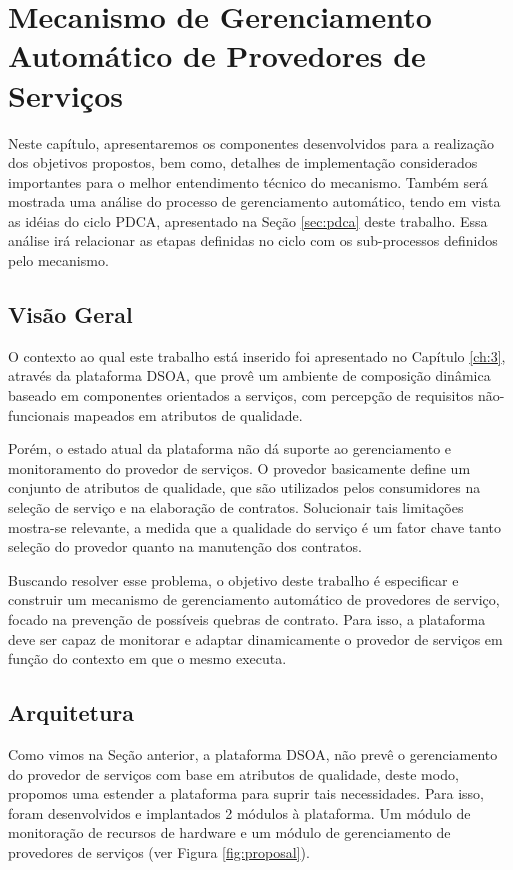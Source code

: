 \chapter{Mecanismo de Gerenciamento Automático de Provedores de Serviços}
\label{ch:4}

Neste capítulo, apresentaremos os componentes desenvolvidos para a realização dos objetivos propostos, bem como, detalhes de implementação considerados importantes para o melhor entendimento técnico do mecanismo. Também será mostrada uma análise do processo de gerenciamento automático, tendo em vista as idéias do ciclo PDCA, apresentado na Seção \ref{sec:pdca} deste trabalho. Essa análise irá relacionar as etapas definidas no ciclo com os sub-processos definidos pelo mecanismo.

\section{Visão Geral}
O contexto ao qual este trabalho está inserido foi apresentado no Capítulo \ref{ch:3}, através da plataforma DSOA, que provê um ambiente de composição dinâmica baseado em componentes orientados a serviços, com percepção de requisitos não-funcionais mapeados em atributos de qualidade. 

Porém, o estado atual da plataforma não dá suporte ao gerenciamento e monitoramento do provedor de serviços. O provedor basicamente define um conjunto de atributos de qualidade, que são utilizados pelos consumidores na seleção de serviço e na elaboração de contratos. Solucionair tais limitações mostra-se relevante, a medida que a qualidade do serviço é um fator chave tanto seleção do provedor quanto na manutenção dos contratos.

Buscando resolver esse problema, o objetivo deste trabalho é especificar e construir um mecanismo de gerenciamento automático de provedores de serviço, focado na prevenção de possíveis quebras de contrato. Para isso, a plataforma deve ser capaz de monitorar e adaptar dinamicamente o provedor de serviços em função do contexto em que o mesmo executa.


\section{Arquitetura}
\label{sec:arch_prop}

Como vimos na Seção anterior, a plataforma DSOA, não prevê o gerenciamento do provedor de serviços com base em atributos de qualidade, deste modo, propomos uma estender a plataforma para suprir tais necessidades. Para isso, foram desenvolvidos e implantados 2 módulos à plataforma. Um módulo de monitoração de recursos de hardware e um módulo de gerenciamento de provedores de serviços (ver Figura \ref{fig:proposal}).

